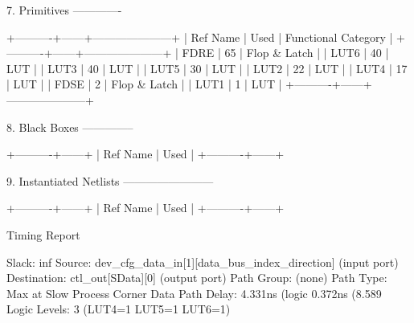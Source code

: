 \documentclass{article}
\begin{document}
7. Primitives
-------------

+----------+------+---------------------+
| Ref Name | Used | Functional Category |
+----------+------+---------------------+
| FDRE     |   65 |        Flop & Latch |
| LUT6     |   40 |                 LUT |
| LUT3     |   40 |                 LUT |
| LUT5     |   30 |                 LUT |
| LUT2     |   22 |                 LUT |
| LUT4     |   17 |                 LUT |
| FDSE     |    2 |        Flop & Latch |
| LUT1     |    1 |                 LUT |
+----------+------+---------------------+


8. Black Boxes
--------------

+----------+------+
| Ref Name | Used |
+----------+------+


9. Instantiated Netlists
------------------------

+----------+------+
| Ref Name | Used |
+----------+------+

\fi
\iffalse

Timing Report

Slack:                    inf
  Source:                 dev_cfg_data_in[1][data_bus_index_direction]
                            (input port)
  Destination:            ctl_out[SData][0]
                            (output port)
  Path Group:             (none)
  Path Type:              Max at Slow Process Corner
  Data Path Delay:        4.331ns  (logic 0.372ns (8.589%
  Logic Levels:           3  (LUT4=1 LUT5=1 LUT6=1)
\end{document}
